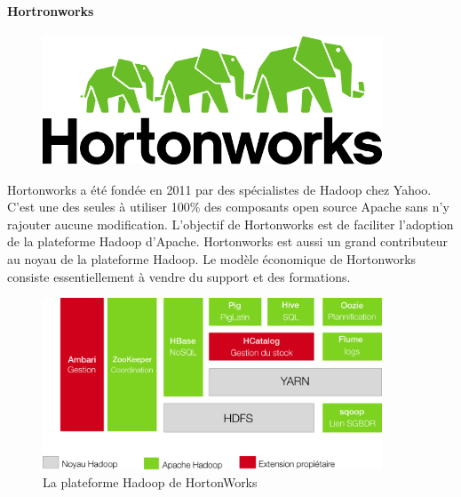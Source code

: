 \documentclass[12pt]{article}
\begin{document}
\paragraph{Hortronworks}
\begin{figure}[H]
\centering
\includegraphics[width=0.9\textwidth]{hortonworks}
\end{figure}
Hortonworks a été fondée en 2011 par des spécialistes de Hadoop chez Yahoo. C'est une des seules à utiliser 100\% des composants open source Apache sans n'y rajouter aucune modification. L'objectif de Hortonworks est de faciliter l'adoption de la plateforme Hadoop d'Apache. Hortonworks est aussi un grand contributeur au noyau de la plateforme Hadoop. Le modèle économique de Hortonworks consiste essentiellement à vendre du support et des formations.
\begin{figure}[H]
\centering
\includegraphics[width=0.9\textwidth]{Horton}
\caption{La plateforme Hadoop de HortonWorks}
\end{figure}
\end{document}
